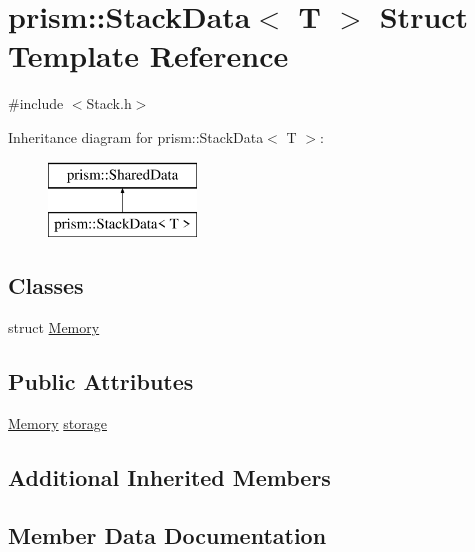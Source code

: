 \hypertarget{structprism_1_1_stack_data}{}\section{prism\+:\+:Stack\+Data$<$ T $>$ Struct Template Reference}
\label{structprism_1_1_stack_data}


{\ttfamily \#include $<$Stack.\+h$>$}

Inheritance diagram for prism\+:\+:Stack\+Data$<$ T $>$\+:\begin{figure}[H]
\begin{center}
\leavevmode
\includegraphics[height=2.000000cm]{structprism_1_1_stack_data}
\end{center}
\end{figure}
\subsection*{Classes}
\begin{DoxyCompactItemize}
\item 
struct \hyperlink{structprism_1_1_stack_data_1_1_memory}{Memory}
\end{DoxyCompactItemize}
\subsection*{Public Attributes}
\begin{DoxyCompactItemize}
\item 
\hyperlink{structprism_1_1_stack_data_1_1_memory}{Memory} \hyperlink{structprism_1_1_stack_data_a5e74274b678041cfd7676d08eed3864a}{storage}
\end{DoxyCompactItemize}
\subsection*{Additional Inherited Members}


\subsection{Member Data Documentation}
